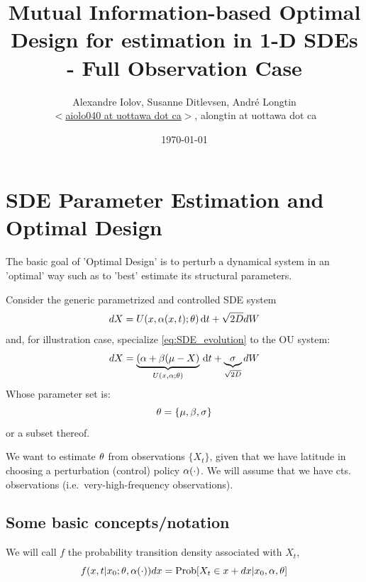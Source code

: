 \documentclass{article}
\begin{document}
\title{Mutual Information-based Optimal Design for estimation in 1-D SDEs -
Full Observation Case}
 \author{Alexandre Iolov, Susanne
Ditlevsen, Andr\'e Longtin  \\ $<$\href{mailto:aiolo040@uottawa.ca}
		{aiolo040 at uottawa dot ca}$>$, alongtin at uottawa dot ca}

\date{\today}
 
\maketitle
 

\tableofcontents   
 
\section{SDE Parameter Estimation and Optimal Design}
The basic goal of 'Optimal Design' is to perturb a dynamical system in an
'optimal' way such as to 'best' estimate its structural parameters.

Consider the generic parametrized and controlled SDE system 
\begin{equation}
dX = U(x,{\alpha}(x,t); {\theta}) \, \mathrm{d} t + \sqrt{2D} dW
\label{eq:SDE_evolution} 
\end{equation}
and, for illustration case, specialize \cref{eq:SDE_evolution} to the OU
system:
\begin{equation}
dX = \underbrace{({\alpha} + {\beta}( \mu - X)}_{U(x,{\alpha}; {\theta})} \, \mathrm{d} t +
\underbrace{{\sigma }}_{\sqrt{2D}} dW
\label{eq:OU_evolution} 
\end{equation}
Whose parameter set is:
$$
{\theta} = \{{\mu }, {\beta}, {\sigma }\}
$$
or a subset thereof.

We want to estimate ${\theta}$  from observations $\{ X_t \}$, given that we have
latitude in choosing a perturbation (control) policy ${\alpha}(\cdot)$. We will assume
that we have cts. observations (i.e.\ very-high-frequency observations). 

\subsection{Some basic concepts/notation}
We will call $f$ the probability transition density associated with $X_t$, 
\begin{equation}
f(x,t| x_0 ;{\theta}, {\alpha}(\cdot)) dx = \operatorname{Prob}[ X_t \in x + dx | x_0, {\alpha}, {\theta}]
\end{equation} 
\end{document}
